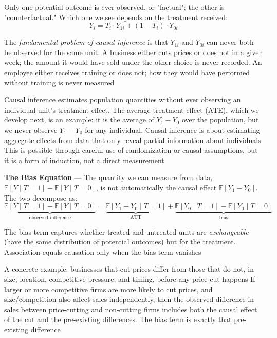Only one potential outcome is ever observed, or "factual"; the other is "counterfactual."
Which one we see depends on the treatment received:
\begin{equation}
  Y_{i}= T_{i}\cdot Y_{1i}+ (1 - T_{i}) \cdot Y_{0i}\label{eq:factual-counterfactual}
\end{equation}

The \emph{fundamental problem of causal inference} is that $Y_{1i}$ and $Y_{0i}$
can never both be observed for the same unit. A business either cuts prices or does
not in a given week; the amount it would have sold under the other choice is
never recorded. An employee either receives training or does not; how they would
have performed without training is never measured

Causal inference estimates population quantities without ever observing an individual
unit's treatment effect. The average treatment effect (ATE), which we develop next,
is an example: it is the average of $Y_{1}- Y_{0}$ over the population, but we
never observe $Y_{1}- Y_{0}$ for any individual. Causal inference is about estimating
aggregate effects from data that only reveal partial information about individuals
This is possible through careful use of randomization or causal assumptions, but
it is a form of induction, not a direct measurement

\textbf{The Bias Equation} --- The quantity we can measure from data, $\mathbb{E}
[Y \mid T = 1] - \mathbb{E}[Y \mid T = 0]$, is not automatically the causal
effect $\mathbb{E}[Y_{1}- Y_{0}]$. The two decompose as:
\begin{equation}
  \underbrace{\mathbb{E}[Y \mid T = 1] - \mathbb{E}[Y \mid T = 0]}_{\text{observed
  difference}}= \underbrace{\mathbb{E}[Y_1 - Y_0 \mid T = 1]}_{\text{ATT}}+ \underbrace{\mathbb{E}[Y_0
  \mid T = 1] - \mathbb{E}[Y_0 \mid T = 0]}_{\text{bias}}\label{eq:bias-equation}
\end{equation}

The bias term captures whether treated and untreated units are \emph{exchangeable}
(have the same distribution of potential outcomes) but for the treatment. Association
equals causation only when the bias term vanishes

A concrete example: businesses that cut prices differ from those that do not, in
size, location, competitive pressure, and timing, before any price cut happens
If larger or more competitive firms are more likely to cut prices, and size/competition
also affect sales independently, then the observed difference in sales between
price-cutting and non-cutting firms includes both the causal effect of the cut
and the pre-existing differences. The bias term is exactly that pre-existing difference


